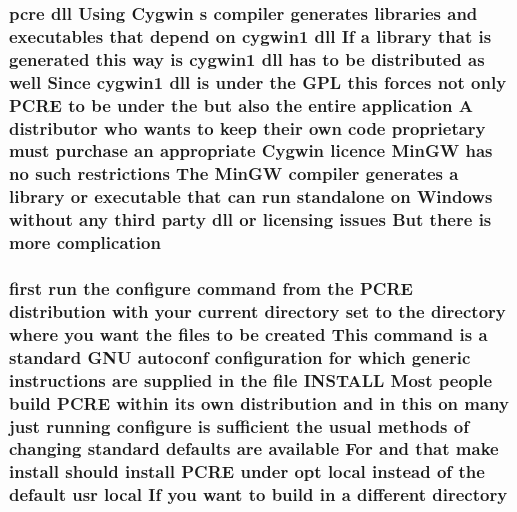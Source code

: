 \subsubsection[{\texorpdfstring{complication}{complication}}]{ {\bf pcre} dll Using Cygwin {\bf s} {\bf compiler} generates {\bf libraries} and executables that depend {\bf on} cygwin1 dll If {\bf a} {\bf library} that {\bf is} {\bf generated} {\bf this} {\bf way} {\bf is} cygwin1 dll has {\bf to} {\bf be} {\bf distributed} {\bf as} well Since cygwin1 dll {\bf is} under the {\bf G\+PL} {\bf this} forces {\bf not} only {\bf P\+C\+RE} {\bf to} {\bf be} under the but also the entire application {\bf A} distributor who wants {\bf to} keep their own {\bf code} proprietary must purchase an appropriate Cygwin {\bf licence} {\bf Min\+GW} has no such restrictions The {\bf Min\+GW} {\bf compiler} generates {\bf a} {\bf library} {\bf or} executable that {\bf can} {\bf run} standalone {\bf on} {\bf Windows} without {\bf any} third party dll {\bf or} licensing issues But there {\bf is} more complication}\hypertarget{NON-AUTOTOOLS-BUILD_8txt_ac32cd05d8de43fdf36806e92cb512ac5}{}\label{NON-AUTOTOOLS-BUILD_8txt_ac32cd05d8de43fdf36806e92cb512ac5}
\subsubsection[{\texorpdfstring{directory}{directory}}]{ {\bf first} {\bf run} the {\bf configure} {\bf command} {\bf from} the {\bf P\+C\+RE} distribution {\bf with} your {\bf current} directory {\bf set} {\bf to} the directory {\bf where} you want the {\bf files} {\bf to} {\bf be} created This {\bf command} {\bf is} {\bf a} standard G\+NU autoconf configuration for {\bf which} generic {\bf instructions} {\bf are} supplied {\bf in} the {\bf file} I\+N\+S\+T\+A\+LL Most people build {\bf P\+C\+RE} within its own distribution and {\bf in} {\bf this} {\bf on} many just running {\bf configure} {\bf is} sufficient the usual methods {\bf of} changing standard defaults {\bf are} {\bf available} For and that {\bf make} {\bf install} should {\bf install} {\bf P\+C\+RE} under {\bf opt} local instead {\bf of} the {\bf default} usr local If you want {\bf to} build {\bf in} {\bf a} different directory}\hypertarget{NON-AUTOTOOLS-BUILD_8txt_a272b2b9e51e7eb44066aac5effd11fa8}{}\label{NON-AUTOTOOLS-BUILD_8txt_a272b2b9e51e7eb44066aac5effd11fa8}
